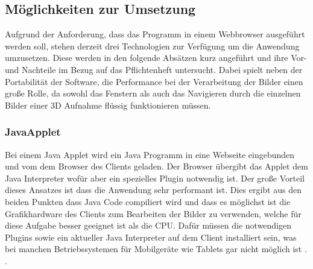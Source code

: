 \subsection{Möglichkeiten zur Umsetzung}
\label{sec:Möglichkeiten zur Umsetzung}
Aufgrund der Anforderung, dass das Programm in einem Webbrowser ausgeführt werden soll, stehen derzeit drei Technologien zur Verfügung um die Anwendung umzusetzen.
Diese werden in den folgende Absätzen kurz angeführt und ihre Vor- und Nachteile im Bezug auf das Pflichtenheft untersucht.
Dabei spielt neben der Portabilität der Software, 
die Performance bei der Verarbeitung der Bilder einen große Rolle, da sowohl das Fenstern als auch das Navigieren durch die einzelnen Bilder einer 3D Aufnahme flüssig funktionieren müssen.

\subsubsection{JavaApplet}
\label{sec:JavaApplet}
Bei einem Java Applet \cite{japp} wird ein Java Programm in eine Webseite eingebunden und vom dem Browser des Clients geladen.
Der Browser übergibt das Applet dem Java Interpreter wofür aber ein spezielles Plugin notwendig ist. 
%
Der große Vorteil dieses Ansatzes ist dass die Anwendung sehr performant ist.
Dies ergibt aus den beiden Punkten dass Java Code compiliert wird und dass es möglichst ist die Grafikhardware des Clients zum Bearbeiten der Bilder zu verwenden,
welche für diese Aufgabe besser geeignet ist als die CPU.
%
Dafür müssen die notwendigen Plugins sowie ein aktueller Java Interpreter auf dem Client installiert sein, 
was bei manchen Betriebssystemen für Mobilgeräte wie Tablets gar nicht möglich ist \cite{japp}. 
.


